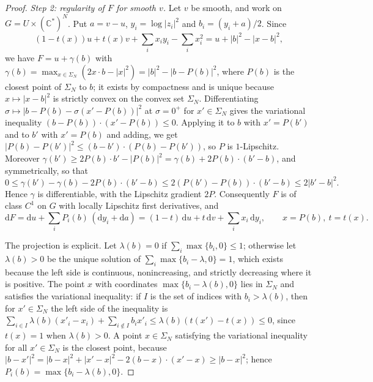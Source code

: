 \begin{proof}
\emph{Step 2: regularity of $F$ for smooth $v$.} Let $v$ be smooth, and work on $G=U\times(\mathbb C^*)^N$. Put $a=v-u$, $y_i=\log|z_i|^2$ and $b_i=(y_i+a)/2$. Since
\[
 (1-t(x))u+t(x)v+\sum_ix_iy_i-\sum_ix_i^2=u+|b|^2-|x-b|^2,
\]
we have $F=u+\gamma(b)$ with $\gamma(b)=\max_{x\in\Sigma_N}(2x\cdot b-|x|^2)=|b|^2-|b-P(b)|^2$, where $P(b)$ is the closest point of $\Sigma_N$ to $b$; it exists by compactness and is unique because $x\mapsto|x-b|^2$ is strictly convex on the convex set $\Sigma_N$. Differentiating $\sigma\mapsto|b-P(b)-\sigma(x'-P(b))|^2$ at $\sigma=0^+$ for $x'\in\Sigma_N$ gives the variational inequality $(b-P(b))\cdot(x'-P(b))\leq0$. Applying it to $b$ with $x'=P(b')$ and to $b'$ with $x'=P(b)$ and adding, we get $|P(b)-P(b')|^2\leq(b-b')\cdot(P(b)-P(b'))$, so $P$ is $1$-Lipschitz. Moreover $\gamma(b')\geq2P(b)\cdot b'-|P(b)|^2=\gamma(b)+2P(b)\cdot(b'-b)$, and symmetrically, so that
\[
 0\leq\gamma(b')-\gamma(b)-2P(b)\cdot(b'-b)\leq2(P(b')-P(b))\cdot(b'-b)\leq2|b'-b|^2.
\]
Hence $\gamma$ is differentiable, with the Lipschitz gradient $2P$. Consequently $F$ is of class $C^1$ on $G$ with locally Lipschitz first derivatives, and
\begin{equation}\label{eq:simplex-supremum-differential}
 \mathrm dF=\mathrm du+\sum_iP_i(b)\,(\mathrm dy_i+\mathrm da)=(1-t)\,\mathrm du+t\,\mathrm dv+\sum_ix_i\,\mathrm dy_i,\qquad x=P(b),\ t=t(x).
\end{equation}

The projection is explicit. Let $\lambda(b)=0$ if $\sum_i\max\{b_i,0\}\leq1$; otherwise let $\lambda(b)>0$ be the unique solution of $\sum_i\max\{b_i-\lambda,0\}=1$, which exists because the left side is continuous, nonincreasing, and strictly decreasing where it is positive. The point $x$ with coordinates $\max\{b_i-\lambda(b),0\}$ lies in $\Sigma_N$ and satisfies the variational inequality: if $I$ is the set of indices with $b_i>\lambda(b)$, then for $x'\in\Sigma_N$ the left side of the inequality is $\sum_{i\in I}\lambda(b)(x'_i-x_i)+\sum_{i\notin I}b_ix'_i\leq\lambda(b)(t(x')-t(x))\leq0$, since $t(x)=1$ when $\lambda(b)>0$. A point $x\in\Sigma_N$ satisfying the variational inequality for all $x'\in\Sigma_N$ is the closest point, because $|b-x'|^2=|b-x|^2+|x'-x|^2-2(b-x)\cdot(x'-x)\geq|b-x|^2$; hence $P_i(b)=\max\{b_i-\lambda(b),0\}$.


\end{proof}
